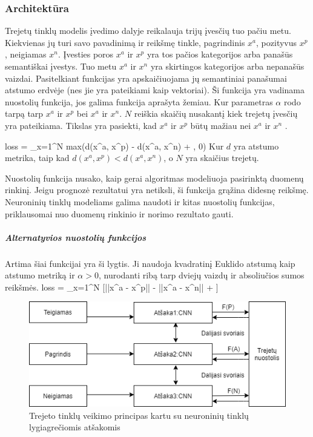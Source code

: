 \documentclass{VUMIFPSkursinis}
\let\[\relax \let\]\relax %
\DeclareRobustCommand{\[}{\begin{equation}}
\DeclareRobustCommand{\]}{\end{equation}}
\begin{document}
\subsubsection{Architektūra}
Trejetų tinklų modelis įvedimo dalyje reikalauja trijų įvesčių tuo pačiu metu. Kiekvienas jų turi savo pavadinimą ir reikšmę tinkle, pagrindinis $x^a$, pozityvus $x^p$, neigiamas $x^n$. Įvesties poros $x^a$ ir $x^p$ yra tos pačios kategorijos arba panašūs semantiškai įvestys. Tuo metu $x^a$ ir $x^n$ yra skirtingos kategorijos arba nepanašūs vaizdai. Pasitelkiant funkcijas yra apskaičiuojama jų semantiniai panašumai atstumo erdvėje (nes jie yra pateikiami kaip vektoriai). Ši funkcija yra vadinama nuostolių funkcija, jos galima funkcija aprašyta žemiau. Kur parametras $\alpha$ rodo tarpą tarp $x^a$ ir $x^p$ bei $x^a$ ir $x^n$. $N$ reiškia skaičių nusakantį kiek trejetų įvesčių yra pateikiama. Tikslas yra pasiekti, kad $x^a$ ir $x^p$ būtų mažiau nei $x^a$ ir $x^n$ \cite{Face_recognition}.

\[loss = \sum_{x=1}^{N} max(d(x^a, x^p) - d(x^a, x^n) + \alpha, 0)\]
Kur $d$ yra atstumo metrika, taip kad $d(x^a, x^p) < d(x^a, x^n)$, o $N$ yra skaičius trejetų.

Nuostolių funkcija nusako, kaip gerai algoritmas modeliuoja pasirinktą duomenų rinkinį. Jeigu prognozė rezultatui yra netiksli, ši funkcija grąžina didesnę reikšmę. Neuroninių tinklų modeliams galima naudoti ir kitas nuostolių funkcijas, priklausomai nuo duomenų rinkinio ir norimo rezultato gauti.

\subparagraph{Alternatyvios nuostolių funkcijos}
Artima šiai funkcijai yra ši lygtis. Ji naudoja kvadratinį Euklido  \cite{Aerial_image_similarity} atstumą kaip atstumo metriką ir $\alpha > 0$, nurodanti ribą tarp dviejų vaizdų ir absoliučios sumos reikšmės.
\[loss = \sum_{x=1}^{N} [||x^a - x^p|| - ||x^a - x^n|| + \alpha]\]

\begin{figure}[H]
\centering
\includegraphics[scale=0.8]{img/Triplet_network_branchCNN}
\caption{Trejeto tinklų veikimo principas kartu su neuroninių tinklų lygiagrečiomis atšakomis} %
\label{img:mlp}
\end{figure}
\end{document}
